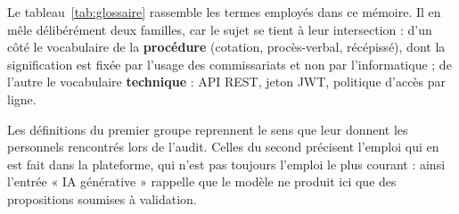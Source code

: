 Le tableau~\ref{tab:glossaire} rassemble les termes employés dans ce mémoire. Il en mêle délibérément deux familles, car le sujet se tient à leur intersection : d'un côté le vocabulaire de la \textbf{procédure} (cotation, procès-verbal, récépissé), dont la signification est fixée par l'usage des commissariats et non par l'informatique ; de l'autre le vocabulaire \textbf{technique} : API REST, jeton JWT, politique d'accès par ligne.

Les définitions du premier groupe reprennent le sens que leur donnent les personnels rencontrés lors de l'audit. Celles du second précisent l'emploi qui en est fait dans la plateforme, qui n'est pas toujours l'emploi le plus courant : ainsi l'entrée « IA générative » rappelle que le modèle ne produit ici que des propositions soumises à validation.

